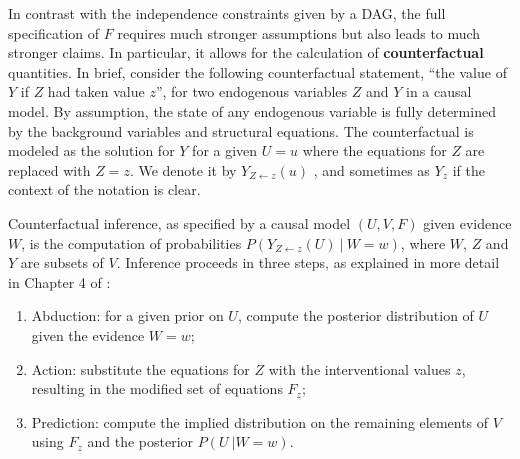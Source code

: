 In contrast with the independence constraints given by a DAG, the full
specification of $F$ requires much stronger assumptions but also leads
to much stronger claims. In particular, it allows for the
calculation of {\bf counterfactual} quantities. %
In brief, consider the following counterfactual
statement, ``the value of $Y$ if $Z$ had taken value $z$'', for two endogenous
variables $Z$ and $Y$ in a causal model. By assumption, the state of
any endogenous variable is fully determined by
the background variables and structural equations. The counterfactual is
modeled as the solution for $Y$ for a given $U = u$ where the equations
for $Z$ are replaced with $Z \!=\! z$.  We denote it by $Y_{Z \leftarrow z}(u)$
\cite{pearl:00}, and sometimes as $Y_z$ if the context of the notation is clear.

Counterfactual inference, as specified by a causal model $(U, V, F)$ given evidence $W$,
is the computation of probabilities
$P(Y_{Z \leftarrow z}(U)\ |\ W \!=\! w)$, where $W$, $Z$ and $Y$ are
subsets of $V$. Inference proceeds in three steps, as explained in
more detail in Chapter 4 of \citet{pearl:16}:
\begin{enumerate}
\item Abduction: for a given prior on $U$, compute the posterior
  distribution of $U$ given the evidence $W = w$;
\item Action: substitute the equations for $Z$ with the interventional
  values $z$, resulting in the modified set of equations $F_z$;
\item Prediction: compute the implied distribution on the remaining
  elements of $V$ using $F_z$ and the posterior $P(U\ | W = w)$.
\end{enumerate}



